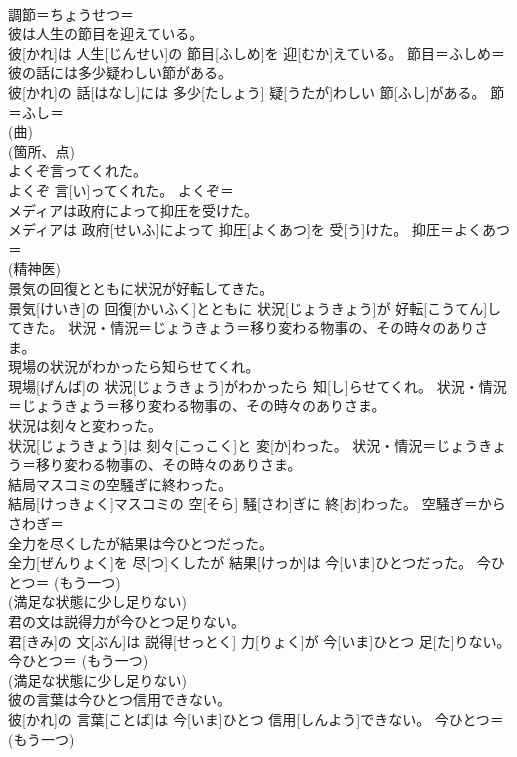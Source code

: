 \documentclass[8pt]{extreport}
\begin{document}
\begin{CJK}{UTF8}{min}
{\\	調節＝ちょうせつ＝ 
\\	彼は人生の節目を迎えている。	
\\	彼[かれ]は 人生[じんせい]の 節目[ふしめ]を 迎[むか]えている。	節目＝ふしめ＝ 
\\	彼の話には多少疑わしい節がある。	
\\	彼[かれ]の 話[はなし]には 多少[たしょう] 疑[うたが]わしい 節[ふし]がある。	節＝ふし＝ 
\\	(曲) 
\\	(箇所、点) 
\\	よくぞ言ってくれた。	
\\	よくぞ 言[い]ってくれた。	よくぞ＝ 
\\	メディアは政府によって抑圧を受けた。	
\\	メディアは 政府[せいふ]によって 抑圧[よくあつ]を 受[う]けた。	抑圧＝よくあつ＝ 
\\	(精神医) 
\\	景気の回復とともに状況が好転してきた。	
\\	景気[けいき]の 回復[かいふく]とともに 状況[じょうきょう]が 好転[こうてん]してきた。	状況・情況＝じょうきょう＝移り変わる物事の、その時々のありさま。
\\	現場の状況がわかったら知らせてくれ。	
\\	現場[げんば]の 状況[じょうきょう]がわかったら 知[し]らせてくれ。	状況・情況＝じょうきょう＝移り変わる物事の、その時々のありさま。
\\	状況は刻々と変わった。	
\\	状況[じょうきょう]は 刻々[こっこく]と 変[か]わった。	状況・情況＝じょうきょう＝移り変わる物事の、その時々のありさま。
\\	結局マスコミの空騒ぎに終わった。	
\\	結局[けっきょく]マスコミの 空[そら] 騒[さわ]ぎに 終[お]わった。	空騒ぎ＝からさわぎ＝ 
\\	全力を尽くしたが結果は今ひとつだった。	
\\	全力[ぜんりょく]を 尽[つ]くしたが 結果[けっか]は 今[いま]ひとつだった。	今ひとつ＝ (もう一つ) 
\\	(満足な状態に少し足りない) 
\\	君の文は説得力が今ひとつ足りない。	
\\	君[きみ]の 文[ぶん]は 説得[せっとく] 力[りょく]が 今[いま]ひとつ 足[た]りない。	今ひとつ＝ (もう一つ) 
\\	(満足な状態に少し足りない) 
\\	彼の言葉は今ひとつ信用できない。	
\\	彼[かれ]の 言葉[ことば]は 今[いま]ひとつ 信用[しんよう]できない。	今ひとつ＝ (もう一つ) 
}
\end{CJK}
\end{document}
